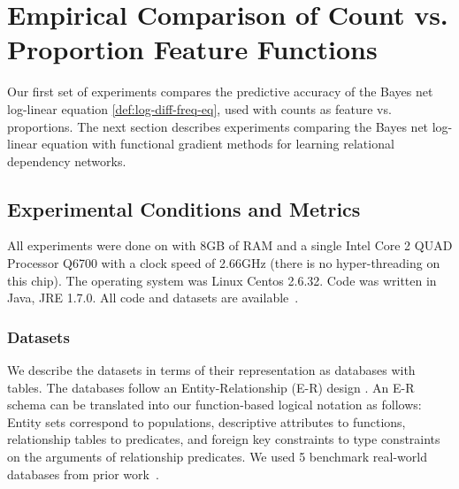 \documentclass[runningheads,a4paper]{llncs}
\begin{document}
\section{Empirical Comparison of Count vs. Proportion Feature Functions}\label{sec:empirical-comparison}

Our first set of experiments compares the predictive accuracy of the Bayes net log-linear equation \eqref{def:log-diff-freq-eq}, used with counts as feature vs. proportions. The next section describes experiments comparing the Bayes net log-linear equation with functional gradient methods for learning relational dependency networks.

\subsection{Experimental Conditions and Metrics}\label{sec:conditions}

All experiments were done on with 8GB of RAM and a single Intel Core 2 QUAD Processor Q6700 with a clock speed of 2.66GHz (there is no hyper-threading on this chip). The operating system was Linux Centos 2.6.32. Code was written in Java, JRE 1.7.0. All code and datasets are available~\cite{bib:jbnsite}. 

\subsubsection{Datasets}

We describe the datasets in terms of their representation as databases with tables. The databases follow an Entity-Relationship (E-R) design \cite{Ullman1982}. An E-R schema can be translated into our function-based logical notation as follows: Entity sets correspond to populations, descriptive attributes to functions, relationship tables to predicates, and foreign key constraints to type constraints on the arguments of relationship predicates.
%
We used %
5 benchmark real-world databases from prior work~\cite{Schulte2012}. 
\end{document}
